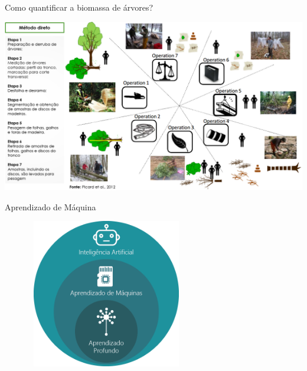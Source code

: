 \documentclass[12pt,ignorenonframetext,aspectratio=1610]{beamer}
\begin{document}
\begin{frame}[t]{Como quantificar a biomassa de árvores?}
		
\begin{center}
	\includegraphics[scale=0.35]{Fig/Biomass2}
\end{center}
	
\end{frame}


\begin{frame}[t]{Aprendizado de Máquina}
    \begin{figure}[H]
        \includegraphics[width=7cm, height=6.5cm]{Fig/diag.png}
    \end{figure}
\end{frame}

\end{document}

